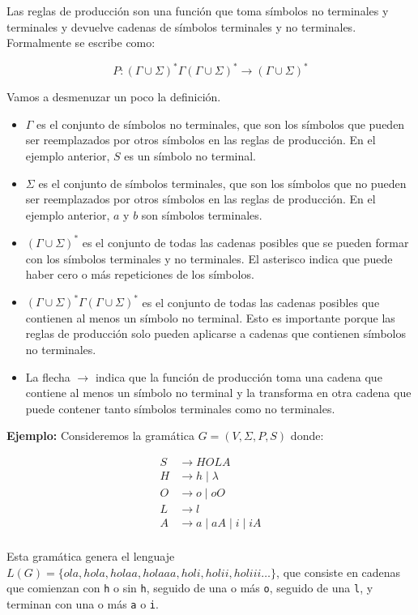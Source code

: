 Las reglas de producción son una función que toma símbolos no terminales y terminales y devuelve cadenas de símbolos terminales y no terminales. Formalmente se escribe como:

$$P: (\Gamma \cup \Sigma)^*  \Gamma (\Gamma \cup \Sigma)^* \rightarrow (\Gamma \cup \Sigma)^*$$

Vamos a desmenuzar un poco la definición.

\begin{itemize}
    \item $\Gamma$ es el conjunto de símbolos no terminales, que son los símbolos que pueden ser reemplazados por otros símbolos en las reglas de producción. En el ejemplo anterior, $S$ es un símbolo no terminal.
    \item $\Sigma$ es el conjunto de símbolos terminales, que son los símbolos que no pueden ser reemplazados por otros símbolos en las reglas de producción. En el ejemplo anterior, $a$ y $b$ son símbolos terminales.
    \item $(\Gamma \cup \Sigma)^*$ es el conjunto de todas las cadenas posibles que se pueden formar con los símbolos terminales y no terminales. El asterisco indica que puede haber cero o más repeticiones de los símbolos.
    \item $(\Gamma \cup \Sigma)^*  \Gamma (\Gamma \cup \Sigma)^*$ es el conjunto de todas las cadenas posibles que contienen al menos un símbolo no terminal. Esto es importante porque las reglas de producción solo pueden aplicarse a cadenas que contienen símbolos no terminales.
    \item La flecha $\rightarrow$ indica que la función de producción toma una cadena que contiene al menos un símbolo no terminal y la transforma en otra cadena que puede contener tanto símbolos terminales como no terminales.
\end{itemize}


\textbf{Ejemplo:} Consideremos la gramática $G = (V, \Sigma, P, S)$ donde:

\begin{align*}
    S &\rightarrow HOLA \\
    H &\rightarrow h \mid \lambda \\
    O &\rightarrow o \mid oO \\
    L &\rightarrow l  \\
    A &\rightarrow a \mid aA \mid i \mid iA \\
\end{align*}

Esta gramática genera el lenguaje $L(G) = \{ola,hola, holaa, holaaa, holi, holii, holiii \dots\}$, 
que consiste en cadenas que comienzan con \texttt{h} o sin \texttt{h}, seguido de una o más \texttt{o}, seguido de una \texttt{l}, 
y terminan con una o más \texttt{a} o \texttt{i}.

